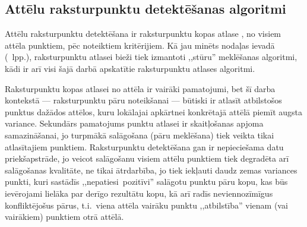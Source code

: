 \subsection{Attēlu raksturpunktu detektēšanas algoritmi} \label{sec:corners}
Attēlu raksturpunktu detektēšana ir raksturpunktu kopas atlase ,
no visiem attēla punktiem, pēc noteiktiem
kritērijiem. Kā jau minēts nodaļas ievadā (\pageref{sec:algo}~lpp.),
raksturpunktu atlasei bieži tiek izmantoti ,,stūru'' meklēšanas algoritmi,
kādi ir arī visi šajā darbā apskatītie raksturpunktu atlases algoritmi.

Raksturpunktu kopas atlasei no attēla ir vairāki pamatojumi,
bet šī darba kontekstā
--- raksturpunktu pāru noteikšanai --- būtiski ir atlasīt atbilstošos punktus
dažādos attēlos, kuru lokālajai apkārtnei konkrētajā attēlā piemīt
augsta variance. Sekundārs pamatojums punktu atlasei ir
skaitļošanas apjoma samazināšanai, jo turpmākā salāgošana (pāru meklēšana)
tiek veikta
tikai atlasītajiem punktiem. Raksturpunktu detektēšana gan ir nepieciešama
datu priekšapstrāde, jo veicot salāgošanu visiem attēlu punktiem tiek
degradēta arī salāgošanas kvalitāte, ne tikai ātrdarbība, jo tiek
iekļauti daudz zemas variances punkti, kuri sastādīs
,,nepatiesi~pozitīvi'' salāgotu punktu pāru kopu, kas būs ievērojami
lielāka par derīgo rezultātu kopu, kā arī radīs neviennozīmīgus
konfliktējošus pārus,
t.i.~viena attēla vairāku punktu ,,atbilstība'' vienam (vai vairākiem)
punktiem otrā attēlā.

